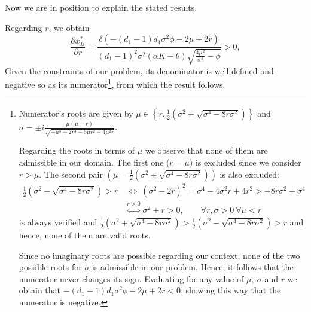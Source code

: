 Now we are in position to explain the stated results.

Regarding $r$, we obtain
$$\frac{\partial x^*_B}{\partial r}=\frac{\delta  \left(-(d_1-1) d_1 \sigma ^2 \phi-2 \mu +2 r \right)}{(d_1-1)^2 \sigma ^2 (\alpha  K-\theta ) \sqrt{\frac{4 \mu ^2}{\sigma ^4}-\phi}}>0,$$
Given the constraints of our problem, its denominator is well-defined and negative so as its numerator\footnote{Numerator's roots are given by $\mu \in \left\{r, \frac{1}{2}\left(\sigma ^2\pm\sqrt{\sigma ^4-8 r \sigma ^2}\right) \right\}$ and $\sigma = \pm i \frac{ \mu  (\mu -r)}{\sqrt{-\mu ^3+2 r^3-5 \mu  r^2+4 \mu ^2 r}}$.


Regarding the roots in terms of $\mu$ we observe that none of them are admissible in our domain. The first one ($r=\mu$) is excluded since we consider $r>\mu$. The second pair $\left(\mu=\frac{1}{2}\left(\sigma ^2\pm\sqrt{\sigma ^4-8 r \sigma ^2}\right) \right)$ is also excluded: 
\begin{align*}
\frac{1}{2}\left(\sigma ^2-\sqrt{\sigma ^4-8 r \sigma ^2}\right)>r & \ \Leftrightarrow \  (\sigma ^2-2r)^2= \sigma^4-4\sigma^2 r +4 r^2 > -8 r \sigma^2+\sigma^4\\
&\overset{r>0}{\Leftrightarrow} \sigma^2+r>0, \qquad \forall r, \sigma>0 \ \forall \mu<r
\end{align*}
is always verified and $\frac{1}{2}\left(\sigma ^2+\sqrt{\sigma ^4-8 r \sigma ^2}\right)>\frac{1}{2}\left(\sigma ^2-\sqrt{\sigma ^4-8 r \sigma ^2}\right)>r$ and hence, none of them are valid roots.

Since no imaginary roots are possible regarding our context, none of the two possible roots for $\sigma$ is admissible in our problem. Hence, it follows that the numerator never changes its sign. Evaluating for any value of $\mu, \ \sigma$ and $r$ we obtain that $-(d_1-1) d_1 \sigma ^2 \phi-2 \mu +2 r <0$, showing this way that the numerator is negative. },
from which the result follows.

